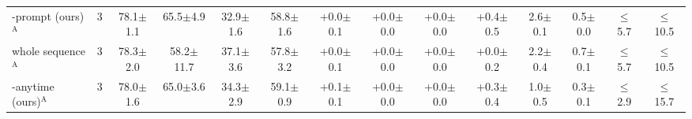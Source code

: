 \begin{table}[t]
{\begin{tabular}{l c ccc cc ccc cc cc}
\method{}-prompt (ours)$^{\mathrm{A}}$ & 3 & 78.1{\scriptsize$\pm$1.1} & 65.5{\scriptsize$\pm$4.9} & 32.9{\scriptsize$\pm$1.6} & 58.8{\scriptsize$\pm$1.6} & +0.0{\scriptsize$\pm$0.1} & +0.0{\scriptsize$\pm$0.0} & +0.0{\scriptsize$\pm$0.0} & +0.4{\scriptsize$\pm$0.5} & 2.6{\scriptsize$\pm$0.1} & 0.5{\scriptsize$\pm$0.0} & $\le$5.7 & $\le$10.5 \\
\quad whole sequence$^{\mathrm{A}}$ & 3 & 78.3{\scriptsize$\pm$2.0} & 58.2{\scriptsize$\pm$11.7} & 37.1{\scriptsize$\pm$3.6} & 57.8{\scriptsize$\pm$3.2} & +0.0{\scriptsize$\pm$0.1} & +0.0{\scriptsize$\pm$0.0} & +0.0{\scriptsize$\pm$0.0} & +0.0{\scriptsize$\pm$0.2} & 2.2{\scriptsize$\pm$0.4} & 0.7{\scriptsize$\pm$0.1} & $\le$5.7 & $\le$10.5 \\
\method{}-anytime (ours)$^{\mathrm{A}}$ & 3 & 78.0{\scriptsize$\pm$1.6} & 65.0{\scriptsize$\pm$3.6} & 34.3{\scriptsize$\pm$2.9} & 59.1{\scriptsize$\pm$0.9} & +0.1{\scriptsize$\pm$0.1} & +0.0{\scriptsize$\pm$0.0} & +0.0{\scriptsize$\pm$0.0} & +0.3{\scriptsize$\pm$0.4} & 1.0{\scriptsize$\pm$0.5} & 0.3{\scriptsize$\pm$0.1} & $\le$2.9 & $\le$15.7 \\
\bottomrule
\end{tabular}}
\end{table}
